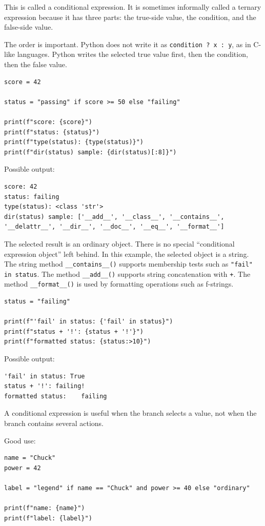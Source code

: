 \documentclass[a4paper,twoside]{report}
\begin{document}
This is called a conditional expression. It is sometimes informally called a ternary expression because it has three parts: the true-side value, the condition, and the false-side value.

The order is important. Python does not write it as \texttt{condition ? x : y}, as in C-like languages. Python writes the selected true value first, then the condition, then the false value.

\begin{verbatim}
score = 42

status = "passing" if score >= 50 else "failing"

print(f"score: {score}")
print(f"status: {status}")
print(f"type(status): {type(status)}")
print(f"dir(status) sample: {dir(status)[:8]}")
\end{verbatim}

Possible output:

\begin{verbatim}
score: 42
status: failing
type(status): <class 'str'>
dir(status) sample: ['__add__', '__class__', '__contains__', '__delattr__', '__dir__', '__doc__', '__eq__', '__format__']
\end{verbatim}

The selected result is an ordinary object. There is no special ``conditional expression object'' left behind. In this example, the selected object is a string. The string method \texttt{\_\_contains\_\_()} supports membership tests such as \texttt{"fail" in status}. The method \texttt{\_\_add\_\_()} supports string concatenation with \texttt{+}. The method \texttt{\_\_format\_\_()} is used by formatting operations such as f-strings.

\begin{verbatim}
status = "failing"

print(f"'fail' in status: {'fail' in status}")
print(f"status + '!': {status + '!'}")
print(f"formatted status: {status:>10}")
\end{verbatim}

Possible output:

\begin{verbatim}
'fail' in status: True
status + '!': failing!
formatted status:    failing
\end{verbatim}

A conditional expression is useful when the branch selects a value, not when the branch contains several actions.

Good use:

\begin{verbatim}
name = "Chuck"
power = 42

label = "legend" if name == "Chuck" and power >= 40 else "ordinary"

print(f"name: {name}")
print(f"label: {label}")
\end{verbatim}
\end{document}
